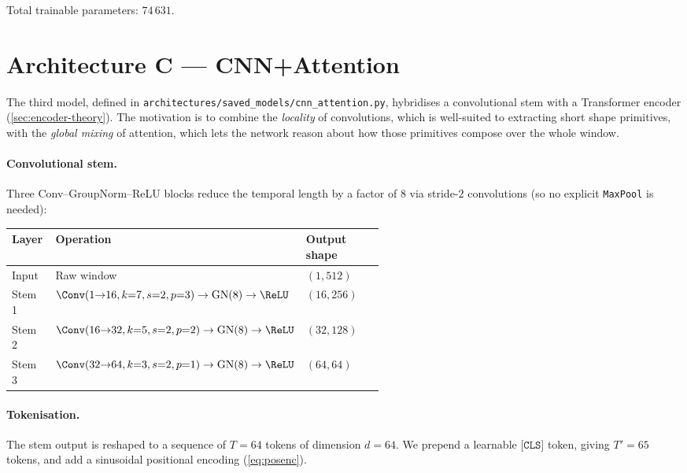 Total trainable parameters: $74\,631$.

\section{Architecture C --- CNN+Attention}
\label{sec:archi-attn}

The third model, defined in
\texttt{architectures/saved\_models/cnn\_attention.py}, hybridises a
convolutional stem with a Transformer encoder
(\cref{sec:encoder-theory}). The motivation is to combine the
\emph{locality} of convolutions, which is well-suited to extracting
short shape primitives, with the \emph{global mixing} of attention,
which lets the network reason about how those primitives compose over
the whole window.

\paragraph{Convolutional stem.}
Three Conv--GroupNorm--ReLU blocks reduce the temporal length by a
factor of $8$ via stride-$2$ convolutions (so no explicit
\texttt{MaxPool} is needed):

\begin{table}[H]
    \centering
    \footnotesize
    \begin{tabular}{@{}l p{0.55\linewidth} l@{}}
        \toprule
        \textbf{Layer} & \textbf{Operation} & \textbf{Output shape} \\
        \midrule
        Input  & Raw window                                                                  & $(1, 512)$ \\
        Stem 1 & $\Conv(1{\to}16, k{=}7, s{=}2, p{=}3) \to \mathrm{GN}(8) \to \ReLU$           & $(16, 256)$ \\
        Stem 2 & $\Conv(16{\to}32, k{=}5, s{=}2, p{=}2) \to \mathrm{GN}(8) \to \ReLU$          & $(32, 128)$ \\
        Stem 3 & $\Conv(32{\to}64, k{=}3, s{=}2, p{=}1) \to \mathrm{GN}(8) \to \ReLU$          & $(64, 64)$ \\
        \bottomrule
    \end{tabular}
\end{table}

\paragraph{Tokenisation.}
The stem output is reshaped to a sequence of $T = 64$ tokens of
dimension $d = 64$. We prepend a learnable
$\texttt{[CLS]}$ token, giving $T' = 65$ tokens, and add a sinusoidal
positional encoding (\cref{eq:posenc}).

